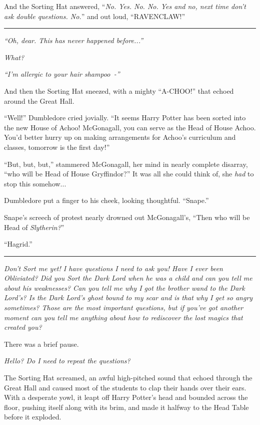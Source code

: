 And the Sorting Hat answered, ``\emph{No. Yes. No. No. Yes and no, next time don't ask double questions. No.}'' and out loud, ``RAVENCLAW!''

\begin{center}\rule{3in}{0.4pt}\end{center}

\emph{``Oh, dear. This has never happened before...''}

\emph{What?}

\emph{``I'm allergic to your hair shampoo~-''}

And then the Sorting Hat sneezed, with a mighty ``A-CHOO!'' that echoed around the Great Hall.

``Well!'' Dumbledore cried jovially. ``It seems Harry Potter has been sorted into the new House of Achoo! McGonagall, you can serve as the Head of House Achoo. You'd better hurry up on making arrangements for Achoo's curriculum and classes, tomorrow is the first day!''

``But, but, but,'' stammered McGonagall, her mind in nearly complete disarray, ``who will be Head of House Gryffindor?'' It was all she could think of, she \emph{had} to stop this somehow...

Dumbledore put a finger to his cheek, looking thoughtful. ``Snape.''

Snape's screech of protest nearly drowned out McGonagall's, ``Then who will be Head of \emph{Slytherin?}''

``Hagrid.''

\begin{center}\rule{3in}{0.4pt}\end{center}

\emph{Don't Sort me yet! I have questions I need to ask you! Have I ever been Obliviated? Did you Sort the Dark Lord when he was a child and can you tell me about his weaknesses? Can you tell me why I got the brother wand to the Dark Lord's? Is the Dark Lord's ghost bound to my scar and is that why I get so angry sometimes? Those are the most important questions, but if you've got another moment can you tell me anything about how to rediscover the lost magics that created you?}

There was a brief pause.

\emph{Hello? Do I need to repeat the questions?}

The Sorting Hat screamed, an awful high-pitched sound that echoed through the Great Hall and caused most of the students to clap their hands over their ears. With a desperate yowl, it leapt off Harry Potter's head and bounded across the floor, pushing itself along with its brim, and made it halfway to the Head Table before it exploded.

